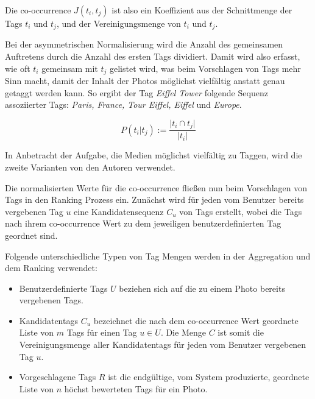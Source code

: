 Die co-occurrence $J(t_i, t_j)$ ist also ein Koeffizient aus der Schnittmenge der Tags ${t_i}$ und ${t_j}$, und der Vereinigungsmenge von ${t_i}$ und ${t_j}$.

Bei der asymmetrischen Normalisierung wird die Anzahl des gemeinsamen Auftretens durch die Anzahl des ersten Tags dividiert. Damit wird also erfasst, wie oft ${t_i}$ gemeinsam mit ${t_j}$ gelistet wird, was beim Vorschlagen von Tags mehr Sinn macht, damit der Inhalt der Photos möglichst vielfältig anstatt genau getaggt werden kann. So ergibt der Tag \emph{Eiffel Tower} folgende Sequenz assoziierter Tags: \emph{Paris, France, Tour Eiffel, Eiffel} und \emph{Europe}.
\begin{figure}[hptb]
 \begin{equation}
 \label{asymmetricNormalization}
  P(t_i \vert t_j) := \frac{\vert t_i \cap t_j \vert}{ \vert t_i \vert }
 \end{equation}
\end{figure}

In Anbetracht der Aufgabe, die Medien möglichst vielfältig zu Taggen, wird die zweite Varianten von den Autoren verwendet.

Die normalisierten Werte für die co-occurrence fließen nun beim Vorschlagen von Tags in den Ranking Prozess ein. Zunächst wird für jeden vom Benutzer bereits vergebenen Tag $u$ eine Kandidatensequenz $C_u$ von Tags erstellt, wobei die Tags nach ihrem co-occurrence Wert zu dem jeweiligen benutzerdefinierten Tag geordnet sind.

Folgende unterschiedliche Typen von Tag Mengen werden in der Aggregation und dem Ranking verwendet:
\begin{itemize}
  \item Benutzerdefinierte Tags $U$ beziehen sich auf die zu einem Photo bereits vergebenen Tags.
  \item Kandidatentags $C_u$ bezeichnet die nach dem co-occurrence Wert geordnete Liste von $m$ Tags für einen Tag $u \in U$. Die Menge $C$ ist somit die Vereinigungsmenge aller Kandidatentags für jeden vom Benutzer vergebenen Tag $u$.
  \item Vorgeschlagene Tags $R$ ist die endgültige, vom System produzierte, geordnete Liste von $n$ höchst bewerteten Tags für ein Photo.
\end{itemize}



